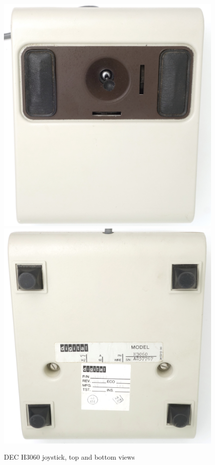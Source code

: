 \documentclass[11pt, a4paper]{article}
\begin{document}
\begin{figure}[h]
    \centering
    \includegraphics[scale=0.38]{1978_dec_h3060_joystick/top_15.jpg}
    \includegraphics[scale=0.38]{1978_dec_h3060_joystick/bottom_15.jpg}
    \caption{DEC H3060 joystick, top and bottom views}
    \label{fig:DecJoystickTopAndBottom}
\end{figure}
\end{document}
